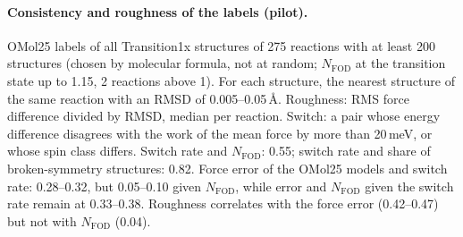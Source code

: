 \paragraph{Consistency and roughness of the labels (pilot).} OMol25 labels of all Transition1x structures of 275 reactions with at least 200 structures (chosen by molecular formula, not at random; $N_\mathrm{FOD}$ at the transition state up to 1.15, 2 reactions above 1). For each structure, the nearest structure of the same reaction with an RMSD of 0.005--0.05\,\AA{}. Roughness: RMS force difference divided by RMSD, median per reaction. Switch: a pair whose energy difference disagrees with the work of the mean force by more than 20\,meV, or whose spin class differs. Switch rate and $N_\mathrm{FOD}$: 0.55; switch rate and share of broken-symmetry structures: 0.82. Force error of the OMol25 models and switch rate: 0.28--0.32, but 0.05--0.10 given $N_\mathrm{FOD}$, while error and $N_\mathrm{FOD}$ given the switch rate remain at 0.33--0.38. Roughness correlates with the force error (0.42--0.47) but not with $N_\mathrm{FOD}$ (0.04).
